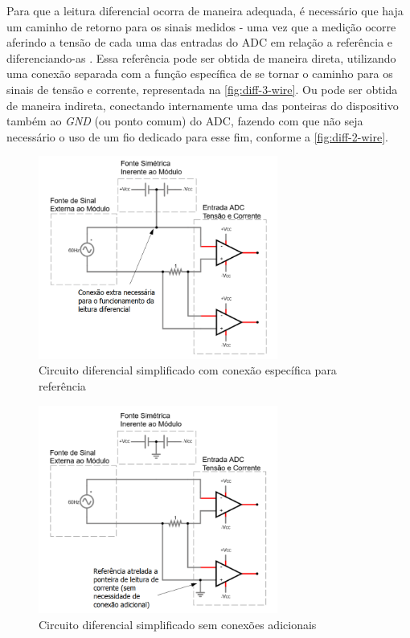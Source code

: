 Para que a leitura diferencial ocorra de maneira adequada, é necessário que haja um caminho de retorno para os sinais medidos - uma vez que a medição ocorre aferindo a tensão de cada uma das entradas do \gls{ADC} em relação a referência e diferenciando-as \cite{mediff}.
Essa referência pode ser obtida de maneira direta, utilizando uma conexão separada com a função específica de se tornar o caminho para os sinais de tensão e corrente, representada na \autoref{fig:diff-3-wire}. Ou pode ser obtida de maneira indireta, conectando internamente uma das ponteiras do dispositivo também ao \textit{GND} (ou ponto comum) do \gls{ADC}, fazendo com que não seja necessário o uso de um fio dedicado para esse fim, conforme a \autoref{fig:diff-2-wire}.

\begin{figure}[htb!]
    \caption{Circuito diferencial simplificado com conexão específica para referência}
    \label{fig:diff-3-wire}
    \includegraphics[width=0.7\textwidth]{figuras/diferencial-3-fios.png}
    \fonte{}
\end{figure}

\begin{figure}[htb!]
    \caption{Circuito diferencial simplificado sem conexões adicionais}
    \label{fig:diff-2-wire}
    \includegraphics[width=0.7\textwidth]{figuras/diferencial-2-fios.png}
    \fonte{}
\end{figure}

